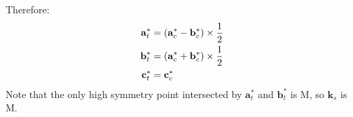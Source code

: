\begin{parts}
	Therefore:
	\begin{align*}
		\mathbf{a}_t^* &= \left(\mathbf{a}_c^* - \mathbf{b}_c^*\right) \times \frac{1}{2} \\
		\mathbf{b}_t^* &= \left(\mathbf{a}_c^* + \mathbf{b}_c^*\right) \times \frac{1}{2} \\
		\mathbf{c}_t^* &= \mathbf{c}_c^*
	\end{align*}
	Note that the only high symmetry point intersected by $\mathbf{a}_t^*$ and $\mathbf{b}_t^*$ is M, so $\mathbf{k}_s$ is M.
\end{parts}